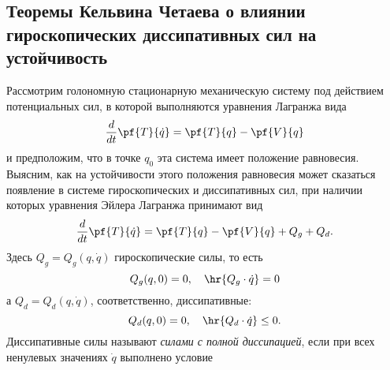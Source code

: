 \documentclass[a4paper,12pt]{article}
\newcommand{\tdf}[1]{\textsl{#1}}
\newcommand{\spr}[2]{\hr{#1 \cdot #2}}
\newcommand{\eql}[2]{\begin{equation}\label{#2}#1\end{equation}}
\begin{document}
\subsection{Теоремы Кельвина Четаева о влиянии гироскопических диссипативных сил на устойчивость}

Рассмотрим голономную стационарную механическую систему под действием потенциальных сил, в которой
выполняются уравнения Лагранжа вида \eql{\frac{d}{dt}\pf{T}{\dot{q}}=\pf{T}{q}-\pf{V}{q}}{La} и
предположим, что в точке $q_0$ эта система имеет положение равновесия. Выясним, как на устойчивости
этого положения равновесия может сказаться появление в системе гироскопических и диссипативных сил,
при наличии которых уравнения Эйлера Лагранжа принимают вид
\eql{\frac{d}{dt}\pf{T}{\dot{q}}=\pf{T}{q}-\pf{V}{q}+Q_g+Q_d.}{Lgd} Здесь $Q_g=Q_g(q,\dot{q})$
гироскопические силы, то есть
\eql{Q_g(q,0)=0,\quad\spr{Q_g}{\dot{q}}=0}{g_eq,} а
$Q_d=Q_d(q,\dot{q})$, соответственно, диссипативные:
\eql{Q_d(q,0)=0,\quad \spr{Q_d}{\dot{q}}\le0.}{d_eq}
Диссипативные силы называют \tdf{силами с полной диссипацией}, если при
всех ненулевых значениях $\dot{q}$ выполнено условие
\equ{\spr{Q_d}{\dot{q}}<0.}
\end{document}
